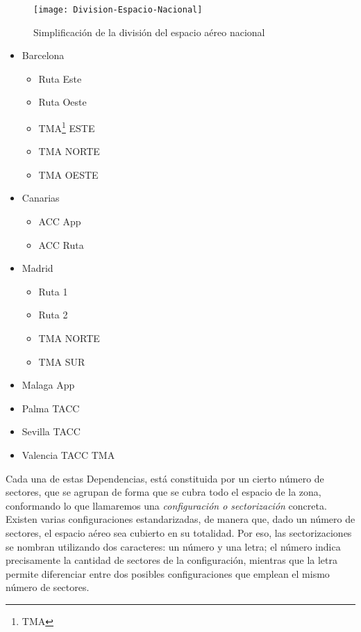 \begin{figure}
    \centering
    \texttt{[image: Division-Espacio-Nacional]}
    \caption{Simplificación de la división del espacio aéreo nacional}
    \label{fig:2:regiones}
\end{figure}

\begin{itemize}
    \item Barcelona
    \begin{itemize}
        \item Ruta Este
        \item Ruta Oeste
        \item TMA\footnote{\acrlong{TMA}} ESTE
        \item TMA NORTE
        \item TMA OESTE
    \end{itemize}
    \item Canarias
    \begin{itemize}
        \item ACC App
        \item ACC Ruta
    \end{itemize}
    \item Madrid
    \begin{itemize}
        \item Ruta 1
        \item Ruta 2
        \item TMA NORTE
        \item TMA SUR
    \end{itemize}
    \item Malaga App
    \item Palma TACC
    \item Sevilla TACC
    \item Valencia TACC TMA
\end{itemize}

Cada una de estas Dependencias, está constituida por un cierto número de sectores, que se agrupan de forma que se cubra todo el espacio de la zona, conformando lo que llamaremos una \textit{configuración o sectorización} concreta.
Existen varias configuraciones estandarizadas, de manera que, dado un número de sectores, el espacio aéreo sea cubierto en su totalidad.
Por eso, las sectorizaciones se nombran utilizando dos caracteres: un número y una letra; el número indica precisamente la cantidad de sectores de la configuración, mientras que la letra permite diferenciar entre dos posibles 
configuraciones que emplean el mismo número de sectores.

